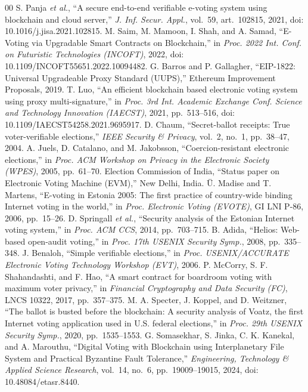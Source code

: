 \documentclass[conference]{IEEEtran}
\begin{document}
\begin{thebibliography}{00}
 S. Panja \emph{et al.}, ``A secure end-to-end verifiable e-voting system using blockchain and cloud server,'' \emph{J. Inf. Secur. Appl.}, vol.~59, art.~102815, 2021, doi: 10.1016/j.jisa.2021.102815.
 M. Saim, M. Mamoon, I. Shah, and A. Samad, ``E-Voting via Upgradable Smart Contracts on Blockchain,'' in \emph{Proc. 2022 Int. Conf. on Futuristic Technologies (INCOFT)}, 2022, doi: 10.1109/INCOFT55651.2022.10094482.
 G. Barros and P. Gallagher, ``EIP-1822: Universal Upgradeable Proxy Standard (UUPS),'' Ethereum Improvement Proposals, 2019.
 T. Luo, ``An efficient blockchain based electronic voting system using proxy multi-signature,'' in \emph{Proc. 3rd Int. Academic Exchange Conf. Science and Technology Innovation (IAECST)}, 2021, pp.~513--516, doi: 10.1109/IAECST54258.2021.9695917.
 D. Chaum, ``Secret-ballot receipts: True voter-verifiable elections,'' \emph{IEEE Security \& Privacy}, vol.~2, no.~1, pp.~38--47, 2004.
 A. Juels, D. Catalano, and M. Jakobsson, ``Coercion-resistant electronic elections,'' in \emph{Proc. ACM Workshop on Privacy in the Electronic Society (WPES)}, 2005, pp.~61--70.
 Election Commission of India, ``Status paper on Electronic Voting Machine (EVM),'' New Delhi, India.
 \"U. Madise and T. Martens, ``E-voting in Estonia 2005: The first practice of country-wide binding Internet voting in the world,'' in \emph{Proc. Electronic Voting (EVOTE)}, GI LNI P-86, 2006, pp.~15--26.
 D. Springall \emph{et al.}, ``Security analysis of the Estonian Internet voting system,'' in \emph{Proc. ACM CCS}, 2014, pp.~703--715.
 B. Adida, ``Helios: Web-based open-audit voting,'' in \emph{Proc. 17th USENIX Security Symp.}, 2008, pp.~335--348.
 J. Benaloh, ``Simple verifiable elections,'' in \emph{Proc. USENIX/ACCURATE Electronic Voting Technology Workshop (EVT)}, 2006.
 P. McCorry, S. F. Shahandashti, and F. Hao, ``A smart contract for boardroom voting with maximum voter privacy,'' in \emph{Financial Cryptography and Data Security (FC)}, LNCS 10322, 2017, pp.~357--375.
 M. A. Specter, J. Koppel, and D. Weitzner, ``The ballot is busted before the blockchain: A security analysis of Voatz, the first Internet voting application used in U.S. federal elections,'' in \emph{Proc. 29th USENIX Security Symp.}, 2020, pp.~1535--1553.
 G. Somasekhar, S. Jinka, C. K. Kanekal, and A. Marouthu, ``Digital Voting with Blockchain using Interplanetary File System and Practical Byzantine Fault Tolerance,'' \emph{Engineering, Technology \& Applied Science Research}, vol.~14, no.~6, pp.~19009--19015, 2024, doi: 10.48084/etasr.8440.

\end{thebibliography}
\end{document}
